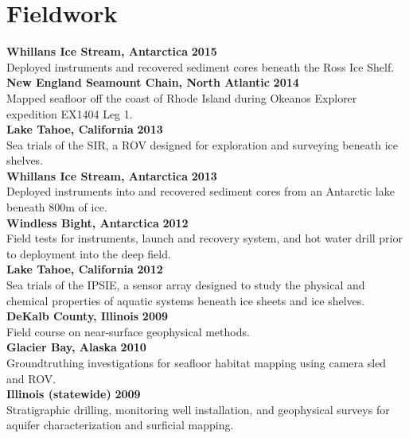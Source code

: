 \section{Fieldwork} 

\textbf{Whillans Ice Stream, Antarctica} \hfill \textbf{2015}\\
Deployed instruments and recovered sediment cores beneath the Ross Ice Shelf. \\

\textbf{New England Seamount Chain, North Atlantic} \hfill \textbf{2014}\\
Mapped seafloor off the coast of Rhode Island during Okeanos Explorer expedition EX1404 Leg 1. \\

\textbf{Lake Tahoe, California} \hfill \textbf{2013}\\
Sea trials of the SIR, a ROV designed for exploration and surveying beneath ice shelves.\\

\textbf{Whillans Ice Stream, Antarctica} \hfill \textbf{2013}\\
Deployed instruments into and recovered sediment cores from an Antarctic lake beneath 800m of ice.\\

\textbf{Windless Bight, Antarctica} \hfill \textbf{2012}\\
Field tests for instruments, launch and recovery system, and hot water drill prior to deployment into the deep field.\\

\textbf{Lake Tahoe, California} \hfill \textbf{2012}\\
Sea trials of the IPSIE, a sensor array designed to study the physical and chemical properties of aquatic systems beneath ice sheets and ice shelves.\\

\textbf{DeKalb County, Illinois} \hfill \textbf{2009}\\
Field course on near-surface geophysical methods.\\

\textbf{Glacier Bay, Alaska} \hfill \textbf{2010}\\
Groundtruthing investigations for seafloor habitat mapping using camera sled and ROV.\\

\textbf{Illinois (statewide)} \hfill \textbf{2009}\\
Stratigraphic drilling, monitoring well installation, and geophysical surveys for aquifer characterization and surficial mapping. \\

